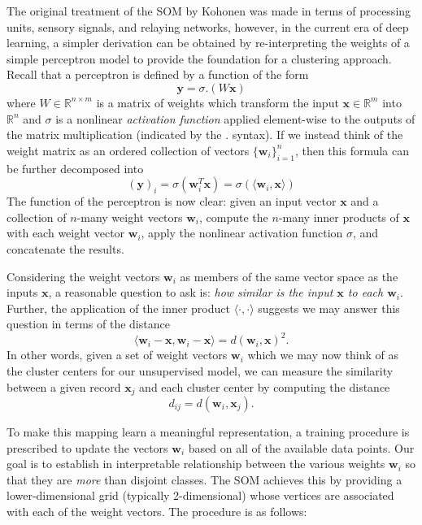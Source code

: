 The original treatment of the SOM by Kohonen was made in terms of processing
units, sensory signals, and relaying networks, however,
in the current era of deep learning, a simpler derivation can be
obtained by re-interpreting the weights of a simple perceptron model to provide
the foundation for a clustering approach. Recall that a perceptron
is defined by a function of the form
\begin{equation}
    \mathbf{y} = \sigma.\left(W\mathbf{x}\right)
\end{equation}
where $W\in\mathbb{R}^{n\times m}$ is a matrix of weights which transform the
input $\mathbf{x}\in\mathbb{R}^m$ into $\mathbb{R}^n$ and $\sigma$ is a
nonlinear \textit{activation function} applied element-wise to the outputs of
the matrix multiplication (indicated by the $.$ syntax). If we instead think of
the weight matrix as an ordered collection of vectors
$\{\mathbf{w}_i\}_{i=1}^{n}$, then this formula can be further decomposed into
\begin{equation}
    (\mathbf{y})_i = \sigma(\mathbf{w}_i^T\mathbf{x}) = \sigma(\langle \mathbf{w}_i, \mathbf{x} \rangle)
\end{equation}
The function of the perceptron is now clear: given an input vector $\mathbf{x}$
and a collection of $n$-many weight vectors $\mathbf{w}_i$, compute the $n$-many
inner products of $\mathbf{x}$ with each weight vector $\mathbf{w}_i$, apply the
nonlinear activation function $\sigma$, and concatenate the results.

Considering the weight vectors $\mathbf{w}_i$ as
members of the same vector space as the inputs $\mathbf{x}$, a reasonable
question to ask is: \textit{how similar is the input $\mathbf{x}$ to each
  $\mathbf{w}_i$}. Further, the application of the inner product $\langle
\cdot,\cdot \rangle$ suggests we may answer this question in terms of the
distance
\begin{equation}
    \langle \mathbf{w}_i-\mathbf{x},  \mathbf{w}_i-\mathbf{x}\rangle = d(\mathbf{w}_i, \mathbf{x})^2.
\end{equation}
In other words, given a set of weight vectors $\mathbf{w}_i$ which we may now
think of as the cluster centers for our unsupervised model, we can measure the
similarity between a given record $\mathbf{x}_j$ and each cluster center by
computing the distance
\begin{equation}
    d_{ij} = d\left(\mathbf{w}_i, \mathbf{x}_j \right).
\end{equation}

To make this mapping learn a meaningful representation, a training procedure is
prescribed to update the vectors $\mathbf{w}_i$ based on all of the available
data points. Our goal is to establish in interpretable relationship between the
various weights $\mathbf{w}_i$ so that they are \textit{more} than disjoint
classes. The SOM achieves this by providing a lower-dimensional grid (typically
2-dimensional) whose vertices are associated with each of the
weight vectors. The procedure is as follows:

